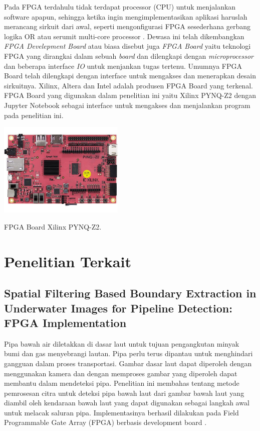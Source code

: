 Pada FPGA terdahulu tidak terdapat processor (CPU) untuk menjalankan software apapun, sehingga ketika ingin mengimplementasikan aplikasi haruslah merancang sirkuit dari awal, seperti mengonfigurasi FPGA sesederhana gerbang logika OR atau serumit multi-core processor . Dewasa ini telah dikembangkan \textit{FPGA Develepment Board} atau biasa disebut juga \textit{FPGA Board} yaitu teknologi FPGA yang dirangkai dalam sebuah \textit{board} dan dilengkapi dengan \textit{microprocessor} dan beberapa interface \textit{IO} untuk menjankan tugas tertenu. Umumnya FPGA Board telah dilengkapi dengan interface untuk mengakses dan menerapkan desain sirkuitnya. Xilinx, Altera dan Intel adalah produsen FPGA Board yang terkenal. FPGA Board yang digunakan dalam penelitian ini yaitu Xilinx PYNQ-Z2 dengan Jupyter Notebook sebagai interface untuk mengakses dan menjalankan program pada penelitian ini.

\begin{afigure}
    \includegraphics[width=6cm, center]{images/pynq-z2.jpeg}
    \caption{FPGA Board Xilinx PYNQ-Z2.}
    \label{fig:pynq-z2}
\end{afigure}


\section{Penelitian Terkait}
\subsection{Spatial Filtering Based Boundary Extraction in Underwater Images for Pipeline Detection: FPGA Implementation}
Pipa bawah air diletakkan di dasar laut untuk tujuan pengangkutan minyak bumi dan gas menyebrangi lautan. Pipa perlu terus dipantau untuk menghindari gangguan dalam proses transportasi. Gambar dasar laut dapat diperoleh dengan menggunakan kamera dan dengan memproses gambar yang diperoleh dapat membantu dalam mendeteksi pipa. Penelitian ini membahas tentang metode pemrosesan citra untuk deteksi pipa bawah laut dari gambar bawah laut yang diambil oleh kendaraan bawah laut yang dapat digunakan sebagai langkah awal untuk melacak saluran pipa. Implementasinya berhasil dilakukan pada Field Programmable Gate Array (FPGA) berbasis development board
.

